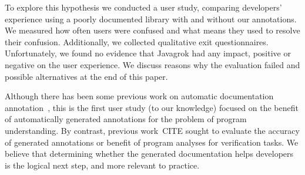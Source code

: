 To explore this hypothesis we conducted a user study, comparing developers'
experience using a poorly documented library with and without our
annotations.  We measured how often users were confused and what means they used to resolve their confusion.  Additionally, we collected qualitative exit
questionnaires.  Unfortunately, we found no evidence that Javagrok had any impact, positive or negative on the user experience.  We discuss reasons why the evaluation failed and possible alternatives at the end of this paper.

Although there has been some previous work on automatic
documentation annotation~\cite{autodoc}, this is the first user study (to our knowledge)
focused on the benefit of automatically generated annotations for the problem of program understanding.  By contrast, previous work~CITE sought to evaluate the accuracy of generated annotations or benefit of program analyses for verification tasks.
We believe that determining whether the generated documentation helps
developers is the logical next step, and more relevant to practice.


